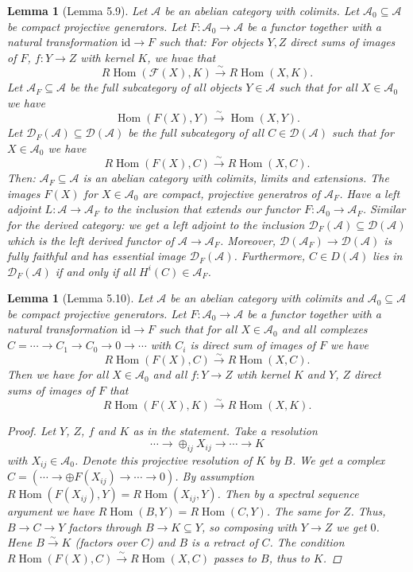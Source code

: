 \documentclass[12pt]{article}
\theoremstyle{darkgreentheorem}
\newtheorem{lm}[thm]{Lemma}
\theoremstyle{darkbluedefinition}
\theoremstyle{darkredexample}
\theoremstyle{remark}
\newcommand{\1}{\mathbbm{1}}
\newcommand{\A}{\mathscr{A}}
\newcommand{\D}{\mathscr{D}}
\newcommand{\F}{\mathcal{F}}
\DeclareMathOperator{\Hom}{Hom}
\newcommand{\op}{\oplus}
\newcommand{\id}{\mathrm{id}}
\newcommand{\sub}{\subseteq}
\begin{document}
\begin{lm}[Lemma 5.9]
    Let $\A$ be an abelian category with colimits.
    Let $\A_{0}\sub \A$ be compact projective generators.
    Let $F\colon \A_{0}\to \A$ be a functor together with a natural transformation $\id\to F$ such that:
    For objects $Y,Z$ direct sums of images of $F$, $f\colon Y\to Z$ with kernel $K$, we hvae that
    \[ R\Hom(\F(X),K)\xrightarrow{\sim} R\Hom(X,K).\]
    Let $\A_{F}\sub \A$ be the full subcategory of all objects $Y\in \A$ such that for all $X\in \A_{0}$ we have
    \[ \Hom(F(X),Y)\xrightarrow{\sim}\Hom(X,Y).\]
    Let $\D_{F}(\A)\sub \D(\A)$ be the full subcategory of all $C\in \D(\A)$ such that for $X\in \A_{0}$ we have
    \[ R\Hom(F(X),C)\xrightarrow{\sim}R\Hom(X,C).\]
    Then: $\A_{F}\sub \A$ is an abelian category with colimits, limits and extensions.
    The images $F(X)$ for $X\in \A_{0}$ are compact, projective generatros of $\A_{F}$.
    Have a left adjoint $L\colon \A\to \A_{F}$ to the inclusion that extends our functor $F\colon \A_{0}\to \A_{F}$.
    Similar for the derived category: we get a left adjoint to the inclusion $\D_{F}(\A)\sub \D(\A)$ which is the left derived functor of $\A\to \A_{F}$.
    Moreover, $\D(\A_{F})\to \D(\A)$ is fully faithful and has essential image $\D_{F}(\A)$.
    Furthermore, $C\in D(\A)$ lies in $\D_{F}(\A)$ if and only if all $H^{i}(C)\in \A_{F}$.
\end{lm}

\begin{lm}[Lemma 5.10]
    Let $\A$ be an abelian category with colimits and $\A_{0}\sub \A$ be compact projective generators.
    Let $F\colon \A_{0}\to \A$ be a functor together with a natural transformation $\id\to F$ such that for all $X\in \A_{0}$ and all complexes $C=\cdots\to C_{1}\to C_{0}\to 0\to \cdots $ with $C_{i}$ is direct sum of images of $F$ we have
    \[ R\Hom(F(X),C)\xrightarrow{\sim}R\Hom(X,C).\]
    Then we have for all $X\in \A_{0}$ and all $f\colon Y\to Z$ wtih kernel $K$ and $Y$, $Z$ direct sums of images of $F$ that
    \[ R\Hom(F(X),K)\xrightarrow{\sim}R\Hom(X,K).\]
    \begin{proof}
	Let $Y$, $Z$, $f$ and $K$ as in the statement.
	Take a resolution
	\[ \cdots \to \op_{ij}X_{ij}\to \cdots \to K\]
	with $X_{ij}\in \A_{0}$.
	Denote this projective resolution of $K$ by $B$.
	We get a complex $C=(\cdots \to \op F(X_{ij})\to \cdots \to 0)$.
	By assumption $R\Hom(F(X_{ij}),Y)=R\Hom(X_{ij},Y)$.
	Then by a spectral sequence argument we have $R\Hom(B,Y)=R\Hom(C,Y)$.
	The same for $Z$.
	Thus, $B\to C\to Y$ factors through $B\to K\sub Y$, so composing with $Y\to Z$ we get $0$.
	Hene $B\xrightarrow{\sim}K$ (factors over $C$) and $B$ is a retract of $C$.
	The condition $R\Hom(F(X),C)\xrightarrow{\sim}R\Hom(X,C)$ passes to $B$, thus to $K$.
    \end{proof}
\end{lm}
\end{document}
